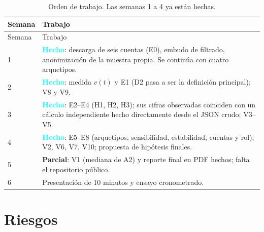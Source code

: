 \documentclass[11pt,letterpaper]{article}
\newcommand{\hecho}{\textcolor{aqua}{\textbf{Hecho}}}
\newcommand{\parcial}{\textcolor{azul}{\textbf{Parcial}}}
\begin{document}
\begin{longtable}{p{2.0cm}p{12.6cm}}
\caption{Orden de trabajo. Las semanas 1 a 4 ya están hechas.}\\
\toprule
Semana & Trabajo \\
\midrule
\endfirsthead
\toprule
Semana & Trabajo \\
\midrule
\endhead
1 & \hecho: descarga de seis cuentas (E0), embudo de filtrado, anonimización de la muestra propia. Se continúa con cuatro arquetipos. \\
2 & \hecho: medida \(v(t)\) y E1 (D2 pasa a ser la definición principal); V8 y V9. \\
3 & \hecho: E2--E4 (H1, H2, H3); sus cifras observadas coinciden con un cálculo independiente hecho directamente desde el JSON crudo; V3--V5. \\
4 & \hecho: E5--E8 (arquetipos, sensibilidad, estabilidad, cuentas y rol); V2, V6, V7, V10; propuesta de hipótesis finales. \\
5 & \parcial: V1 (mediana de A2) y reporte final en PDF hechos; falta el repositorio público. \\
6 & Presentación de 10 minutos y ensayo cronometrado. \\
\bottomrule
\end{longtable}

\section{Riesgos}
\end{document}
